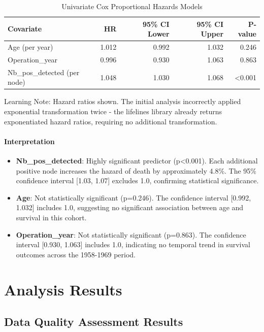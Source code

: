 \documentclass[12pt,a4paper]{article}
\begin{document}
\begin{table}[H]
\centering
\caption{Univariate Cox Proportional Hazards Models}
\label{tab:cox_univariate}
\begin{tabular}{lrrrr}
\toprule
\textbf{Covariate} & \textbf{HR} & \textbf{95\% CI Lower} & \textbf{95\% CI Upper} & \textbf{P-value} \\
\midrule
Age (per year) & 1.012 & 0.992 & 1.032 & 0.246 \\
Operation\_year & 0.996 & 0.930 & 1.063 & 0.863 \\
Nb\_pos\_detected (per node) & 1.048 & 1.030 & 1.068 & <0.001 \\
\bottomrule
\end{tabular}
\end{table}

Learning Note: Hazard ratios shown. The initial analysis incorrectly applied exponential transformation twice - the lifelines library already returns exponentiated hazard ratios, requiring no additional transformation.

\paragraph{Interpretation}
\begin{itemize}
    \item \textbf{Nb\_pos\_detected}: Highly significant predictor (p<0.001). Each additional positive node increases the hazard of death by approximately 4.8\%. The 95\% confidence interval [1.03, 1.07] excludes 1.0, confirming statistical significance.
    
    \item \textbf{Age}: Not statistically significant (p=0.246). The confidence interval [0.992, 1.032] includes 1.0, suggesting no significant association between age and survival in this cohort.
    
    \item \textbf{Operation\_year}: Not statistically significant (p=0.863). The confidence interval [0.930, 1.063] includes 1.0, indicating no temporal trend in survival outcomes across the 1958-1969 period.
\end{itemize}

\section{Analysis Results}

\subsection{Data Quality Assessment Results}
\end{document}
